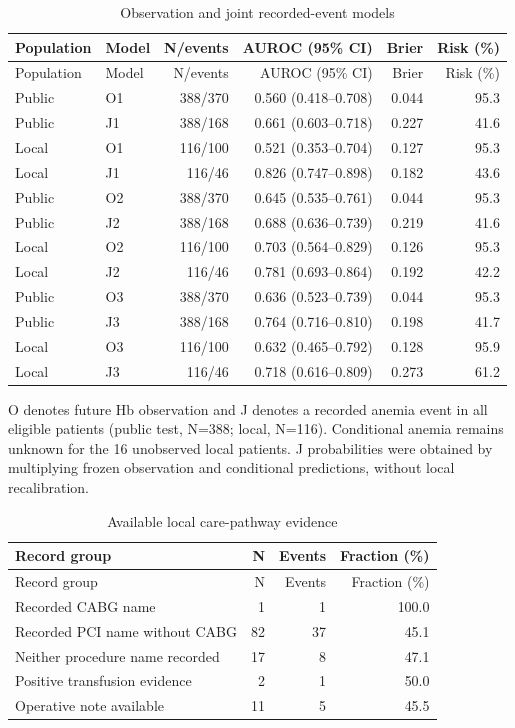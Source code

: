 \documentclass[pdflatex,sn-vancouver-num]{sn-jnl}
\begin{document}
\begingroup\scriptsize\setlength{\tabcolsep}{2pt}
\begin{longtable}{llrrrr}
\caption{Observation and joint recorded-event models}\label{tab:s6}\\
\toprule
Population & Model & N/events & AUROC (95\% CI) & Brier & Risk (\%)\\\midrule
\endfirsthead
\toprule
Population & Model & N/events & AUROC (95\% CI) & Brier & Risk (\%)\\\midrule
\endhead
\endfoot
\bottomrule\endlastfoot
Public & O1 & 388/370 & 0.560 (0.418--0.708) & 0.044 & 95.3\\
Public & J1 & 388/168 & 0.661 (0.603--0.718) & 0.227 & 41.6\\
Local & O1 & 116/100 & 0.521 (0.353--0.704) & 0.127 & 95.3\\
Local & J1 & 116/46 & 0.826 (0.747--0.898) & 0.182 & 43.6\\
Public & O2 & 388/370 & 0.645 (0.535--0.761) & 0.044 & 95.3\\
Public & J2 & 388/168 & 0.688 (0.636--0.739) & 0.219 & 41.6\\
Local & O2 & 116/100 & 0.703 (0.564--0.829) & 0.126 & 95.3\\
Local & J2 & 116/46 & 0.781 (0.693--0.864) & 0.192 & 42.2\\
Public & O3 & 388/370 & 0.636 (0.523--0.739) & 0.044 & 95.3\\
Public & J3 & 388/168 & 0.764 (0.716--0.810) & 0.198 & 41.7\\
Local & O3 & 116/100 & 0.632 (0.465--0.792) & 0.128 & 95.9\\
Local & J3 & 116/46 & 0.718 (0.616--0.809) & 0.273 & 61.2\\
\end{longtable}
\noindent O denotes future Hb observation and J denotes a recorded anemia event in all eligible patients (public test, N=388; local, N=116). Conditional anemia remains unknown for the 16 unobserved local patients. J probabilities were obtained by multiplying frozen observation and conditional predictions, without local recalibration.\par\endgroup
\begingroup\scriptsize\setlength{\tabcolsep}{2pt}
\begin{longtable}{p{7.3cm}rrr}
\caption{Available local care-pathway evidence}\label{tab:s7}\\
\toprule
Record group & N & Events & Fraction (\%)\\\midrule
\endfirsthead
\toprule
Record group & N & Events & Fraction (\%)\\\midrule
\endhead
\endfoot
\bottomrule\endlastfoot
Recorded CABG name & 1 & 1 & 100.0\\
Recorded PCI name without CABG & 82 & 37 & 45.1\\
Neither procedure name recorded & 17 & 8 & 47.1\\
Positive transfusion evidence & 2 & 1 & 50.0\\
Operative note available & 11 & 5 & 45.5\\
\end{longtable}
\end{document}
